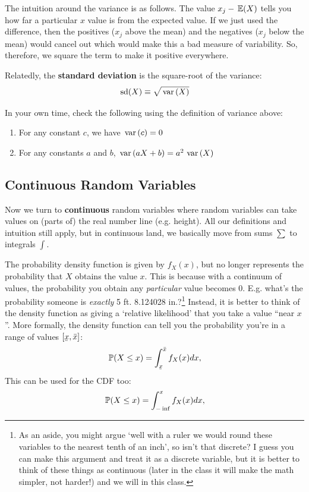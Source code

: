 \documentclass[12pt]{article}
\begin{document}
The intuition around the variance is as follows. The value $x_j - \expec{X}$ tells you how far a particular $x$ value is from the expected value. If we just used the difference, then the positives ($x_j$ above the mean) and the negatives ($x_j$ below the mean) would cancel out which would make this a bad measure of variability. So, therefore, we square the term to make it positive everywhere.

Relatedly, the \textbf{standard deviation} is the square-root of the variance: 
$$
  \sd{X} \equiv \sqrt{\var{X}}
$$

In your own time, check the following using the definition of variance above:
\begin{enumerate}
  \item For any constant $c$, we have $\var{c} = 0$
  
  \item For any constants $a$ and $b$, $\var{aX + b} = a^2 \var{X}$
\end{enumerate}


\subsection*{Continuous Random Variables}

Now we turn to \textbf{continuous} random variables where random variables can take values on (parts of) the real number line (e.g. height). All our definitions and intuition still apply, but in continuous land, we basically move from sums $\sum$ to integrals $\int$. 

The probability density function is given by $f_{X}(x)$, but no longer represents the probability that $X$ obtains the value $x$. This is because with a continuum of values, the probability you obtain any \emph{particular} value becomes 0. E.g. what's the probability someone is \emph{exactly} 5 ft. 8.124028 in.?\footnote{As an aside, you might argue `well with a ruler we would round these variables to the nearest tenth of an inch', so isn't that discrete? I guess you can make this argument and treat it as a discrete variable, but it is better to think of these things as continuous (later in the class it will make the math simpler, not harder!) and we will in this class.}
Instead, it is better to think of the density function as giving a `relative likelihood' that you take a value ``near $x$''. More formally, the density function can tell you the probability you're in a range of values $[\ubar{x}, \bar{x}]$: 
$$
  \P{X \leq x} = \int_{\ubar{x}}^{\bar{x}} f_{X}(x) dx,
$$
This can be used for the CDF too:
$$
  \P{X \leq x} = \int_{-\inf}^x f_{X}(x) dx,
$$
\end{document}
